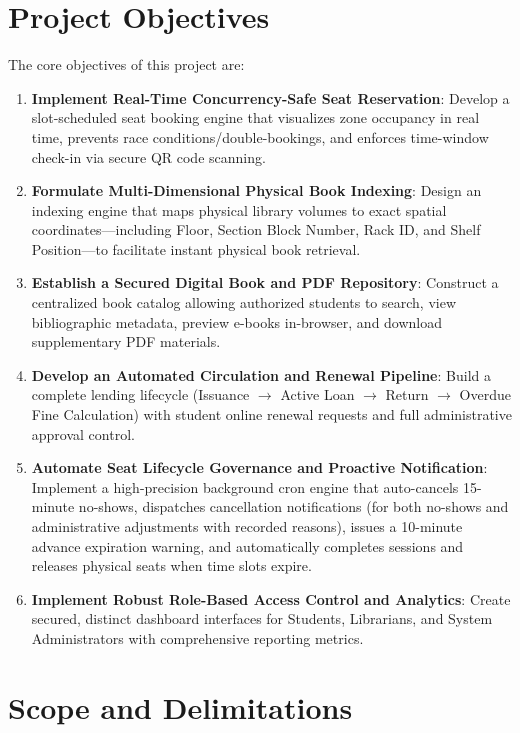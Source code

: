 \section{Project Objectives}
The core objectives of this project are:
\begin{enumerate}
    \item \textbf{Implement Real-Time Concurrency-Safe Seat Reservation}: Develop a slot-scheduled seat booking engine that visualizes zone occupancy in real time, prevents race conditions/double-bookings, and enforces time-window check-in via secure QR code scanning.
    \item \textbf{Formulate Multi-Dimensional Physical Book Indexing}: Design an indexing engine that maps physical library volumes to exact spatial coordinates—including Floor, Section Block Number, Rack ID, and Shelf Position—to facilitate instant physical book retrieval.
    \item \textbf{Establish a Secured Digital Book and PDF Repository}: Construct a centralized book catalog allowing authorized students to search, view bibliographic metadata, preview e-books in-browser, and download supplementary PDF materials.
    \item \textbf{Develop an Automated Circulation and Renewal Pipeline}: Build a complete lending lifecycle (Issuance $\rightarrow$ Active Loan $\rightarrow$ Return $\rightarrow$ Overdue Fine Calculation) with student online renewal requests and full administrative approval control.
    \item \textbf{Automate Seat Lifecycle Governance and Proactive Notification}: Implement a high-precision background cron engine that auto-cancels 15-minute no-shows, dispatches cancellation notifications (for both no-shows and administrative adjustments with recorded reasons), issues a 10-minute advance expiration warning, and automatically completes sessions and releases physical seats when time slots expire.
    \item \textbf{Implement Robust Role-Based Access Control and Analytics}: Create secured, distinct dashboard interfaces for Students, Librarians, and System Administrators with comprehensive reporting metrics.
\end{enumerate}

\section{Scope and Delimitations}
